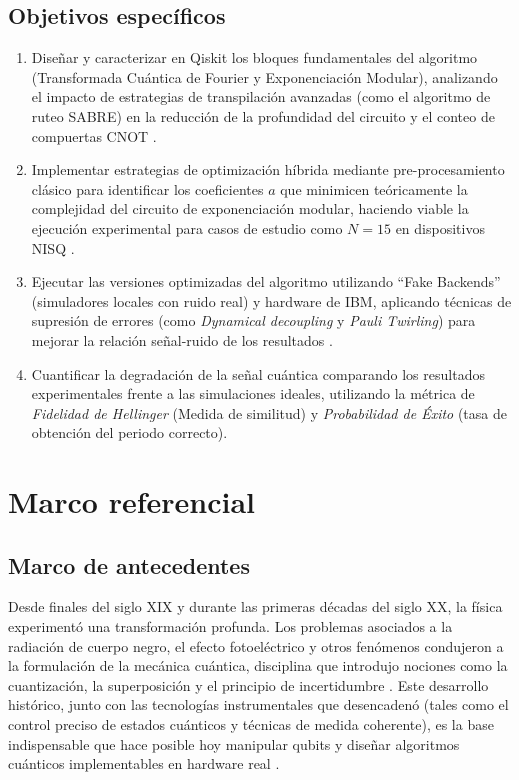 \documentclass[12pt, spanish]{book}
\begin{document}
\section{Objetivos específicos}
\begin{enumerate}
    \item Diseñar y caracterizar en Qiskit los bloques fundamentales del algoritmo
          (Transformada Cuántica de Fourier y Exponenciación Modular),
          analizando el impacto de estrategias de transpilación avanzadas (como
          el algoritmo de ruteo SABRE) en la reducción de la profundidad del
          circuito y el conteo de compuertas CNOT \cite{villarreal}.

    \item Implementar estrategias de optimización híbrida mediante pre-procesamiento
          clásico para identificar los coeficientes $a$ que minimicen teóricamente
          la complejidad del circuito de exponenciación modular, haciendo
          viable la ejecución experimental para casos de estudio como $N=15$
          en dispositivos NISQ \cite{villarreal}.

    \item Ejecutar las versiones optimizadas del algoritmo utilizando ``Fake
          Backends'' (simuladores locales con ruido real) y hardware de IBM,
          aplicando técnicas de supresión de errores (como \textit{Dynamical
              decoupling} y \textit{Pauli Twirling}) para mejorar la relación
          señal-ruido de los resultados \cite{villarreal}.

    \item Cuantificar la degradación de la señal cuántica comparando los resultados
          experimentales frente a las simulaciones ideales, utilizando la métrica
          de \textit{Fidelidad de Hellinger} (Medida de similitud) y \textit{Probabilidad
              de Éxito} (tasa de obtención del periodo correcto).
\end{enumerate}

\chapter{Marco referencial}

\section{Marco de antecedentes}

Desde finales del siglo XIX y durante las primeras décadas del siglo XX, la física experimentó una transformación profunda. Los problemas asociados a la radiación de cuerpo negro, el efecto fotoeléctrico y otros fenómenos condujeron a la formulación de la mecánica cuántica, disciplina que introdujo nociones como la cuantización, la superposición y el principio de incertidumbre \cite{Kleppner2000}. Este desarrollo histórico, junto con las tecnologías instrumentales que desencadenó (tales como el control preciso de estados cuánticos y técnicas de medida coherente), es la base indispensable que hace posible hoy manipular qubits y diseñar algoritmos cuánticos implementables en hardware real \cite{Kleppner2000,Nielsen2024}.\\
\end{document}
